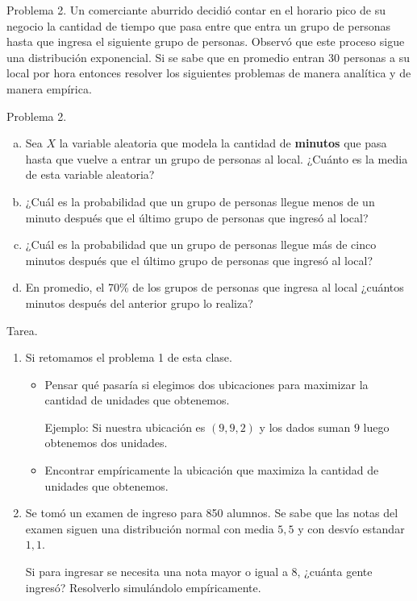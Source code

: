 \documentclass{beamer}
\begin{document}
\begin{frame}[fragile]{Problema 2.}
  Un comerciante aburrido decidió contar en el horario pico de su negocio la cantidad de tiempo que pasa entre que entra un grupo de personas hasta que ingresa el siguiente grupo de personas.
  Observó que este proceso sigue una distribución exponencial.
  Si se sabe que en promedio entran 30 personas a su local por hora entonces resolver los siguientes problemas de manera analítica y de manera empírica.
\end{frame}

\begin{frame}[fragile]{Problema 2.}
  \begin{enumerate}[a)]
    \item Sea $X$ la variable aleatoria que modela la cantidad de \textbf{minutos} que pasa hasta que vuelve a entrar un grupo de personas al local. 
    ¿Cuánto es la media de esta variable aleatoria?
    \item ¿Cuál es la probabilidad que un grupo de personas llegue menos de un minuto después que el último grupo de personas que ingresó al local?
    \item ¿Cuál es la probabilidad que un grupo de personas llegue más de cinco minutos después que el último grupo de personas que ingresó al local?
    \item En promedio, el 70\% de los grupos de personas que ingresa al local ¿cuántos minutos después del anterior grupo lo realiza?
  \end{enumerate}
\end{frame}
  
\begin{frame}[fragile]{Tarea.}
  \begin{enumerate}
    \item Si retomamos el problema 1 de esta clase.

    \begin{itemize}
      \item Pensar qué pasaría si elegimos dos ubicaciones para maximizar la cantidad de unidades que obtenemos.

      {\footnotesize{Ejemplo: Si nuestra ubicación es $(9,9,2)$ y los dados suman $9$ luego obtenemos dos unidades.} }

      \item Encontrar empíricamente la ubicación que maximiza la cantidad de unidades que obtenemos.
    \end{itemize}
    
    \item Se tomó un examen de ingreso para 850 alumnos. 
    Se sabe que las notas del examen siguen una distribución normal con media $5,5$ y con desvío estandar $1,1$.

    Si para ingresar se necesita una nota mayor o igual a 8, ¿cuánta gente ingresó? Resolverlo simulándolo empíricamente. 
  \end{enumerate}
\end{frame}
\end{document}
